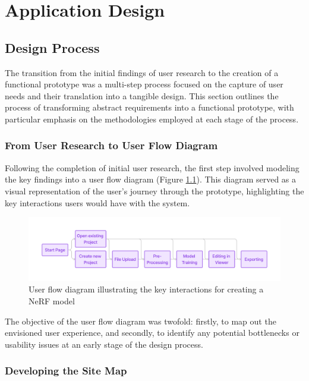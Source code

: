 %
\chapter{Application Design}
\label{sec:design}

\section{Design Process}
\label{sec:design:ux}

The transition from the initial findings of user research to the creation of a functional prototype was a multi-step process focused on the capture of user needs and their translation into a tangible design.
This section outlines the process of transforming abstract requirements into a functional prototype, with particular emphasis on the methodologies employed at each stage of the process.

\subsection*{From User Research to User Flow Diagram}

Following the completion of initial user research, the first step involved modeling the key findings into a user flow diagram (Figure \ref{fig:design:flow-1}).
This diagram served as a visual representation of the user's journey through the prototype, highlighting the key interactions users would have with the system.

\begin{figure}[h!]
	\includegraphics[width=\textwidth]{figures/flow-1.png}
	\caption{User flow diagram illustrating the key interactions for creating a NeRF model}
	\label{fig:design:flow-1}
\end{figure}

The objective of the user flow diagram was twofold: firstly, to map out the envisioned user experience, and secondly, to identify any potential bottlenecks or usability issues at an early stage of the design process.

\subsection*{Developing the Site Map}


